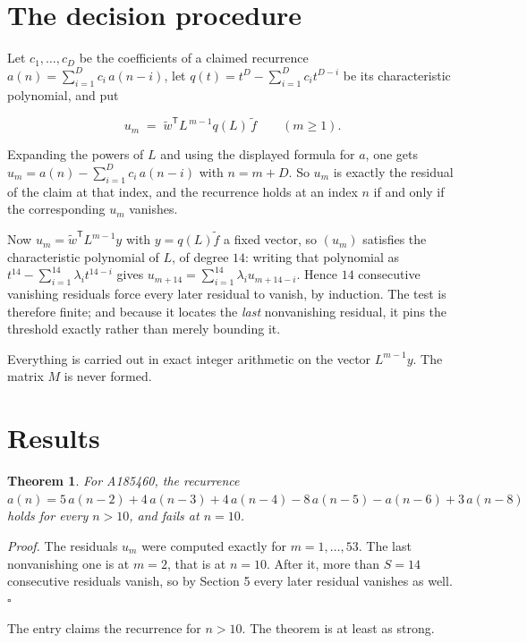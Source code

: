 \documentclass[11pt]{article}
\newtheorem{theorem}{Theorem}
\theoremstyle{definition}
\begin{document}
\section{The decision procedure}

Let $c_1,\dots,c_D$ be the coefficients of a claimed recurrence $a(n) = \sum_{i=1}^{D} c_i\,a(n-i)$, let $q(t) = t^{D} - \sum_{i=1}^{D} c_i t^{D-i}$ be its characteristic polynomial, and put

\[u_m \;=\; \tilde w^{\mathsf T} L^{\,m-1} q(L)\,\tilde f \qquad (m \ge 1).\]

Expanding the powers of $L$ and using the displayed formula for $a$, one gets $u_m = a(n) - \sum_{i=1}^{D} c_i\,a(n-i)$ with $n = m + D$. So $u_m$ is exactly the residual of the claim at that index, and the recurrence holds at an index $n$ if and only if the corresponding $u_m$ vanishes.

Now $u_m = \tilde w^{\mathsf T} L^{m-1} y$ with $y = q(L)\tilde f$ a fixed vector, so $(u_m)$ satisfies the characteristic polynomial of $L$, of degree $14$: writing that polynomial as $t^{14} - \sum_{i=1}^{14} \lambda_i t^{14-i}$ gives $u_{m+14} = \sum_{i=1}^{14} \lambda_i u_{m+14-i}$. Hence $14$ consecutive vanishing residuals force every later residual to vanish, by induction. The test is therefore finite; and because it locates the {\itshape last} nonvanishing residual, it pins the threshold exactly rather than merely bounding it.

Everything is carried out in exact integer arithmetic on the vector $L^{m-1}y$. The matrix $M$ is never formed.

\section{Results}

\begin{theorem} For A185460, the recurrence $a(n) = 5\,a(n-2) + 4\,a(n-3) + 4\,a(n-4) - 8\,a(n-5) - a(n-6) + 3\,a(n-8)$ holds for every $n > 10$, and fails at $n = 10$.\end{theorem}

{\itshape Proof.} The residuals $u_m$ were computed exactly for $m = 1,\dots,53$. The last nonvanishing one is at $m = 2$, that is at $n = 10$. After it, more than $S = 14$ consecutive residuals vanish, so by Section 5 every later residual vanishes as well. $\square$

The entry claims the recurrence for $n > 10$. The theorem is at least as strong.
\end{document}
